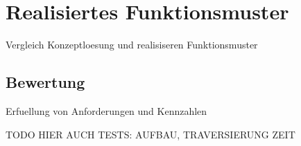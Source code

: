 \section{Realisiertes Funktionsmuster}

Vergleich  Konzeptloesung und realisiseren Funktionsmuster



\subsection{Bewertung}

Erfuellung von Anforderungen und Kennzahlen

TODO HIER AUCH TESTS: AUFBAU, TRAVERSIERUNG ZEIT